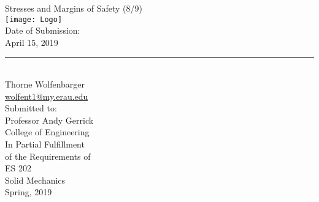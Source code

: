 \begin{center}
  {\huge Stresses and Margins of Safety (8/9)}\\
  \vspace{10px}
  \texttt{[image: Logo]} \\
  Date of Submission:\\
  April 15, 2019\\
  \vspace{30px}
  \rule{300px}{0.5px} \\
  Thorne Wolfenbarger \\
  \href{mailto:wolfent1@my.erau.edu}{wolfent1@my.erau.edu} \\
  \vspace{30px}
  Submitted to: \\
  Professor Andy Gerrick \\
  College of Engineering \\
  \vspace{40px}
  In Partial Fulfillment \\
  of the Requirements of \\
  \vspace{10px}
  ES 202 \\
  Solid Mechanics \\
  Spring, 2019 \\
\end{center}
